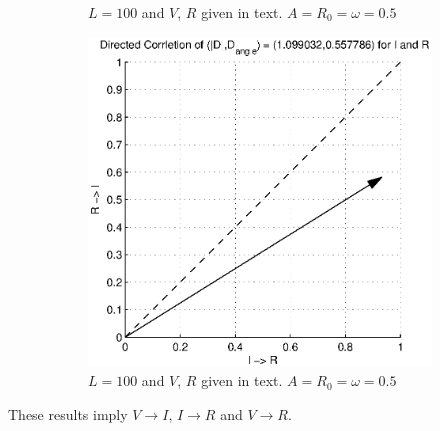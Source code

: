 \documentclass[a4paper,11pt]{article}
\begin{document}
\begin{figure}[h!t]
\begin{subfigure}[b]{0.25\textwidth}
\caption{$L = 100$ and $V$, $R$ given in text. $A=R_0=\omega=0.5$}
\end{subfigure}
\begin{subfigure}[b]{0.25\textwidth}
\label{fig:RL_Rsin1VsinCCMIR}
\includegraphics[scale=0.4]{graphics/RL_Rsin1VsinCCMIR.eps}
\caption{$L = 100$ and $V$, $R$ given in text. $A=R_0=\omega=0.5$}
\end{subfigure}
\caption{}
\end{figure}
These results imply $V\rightarrow I$, $I\rightarrow R$ and $V\rightarrow R$.
\end{document}
